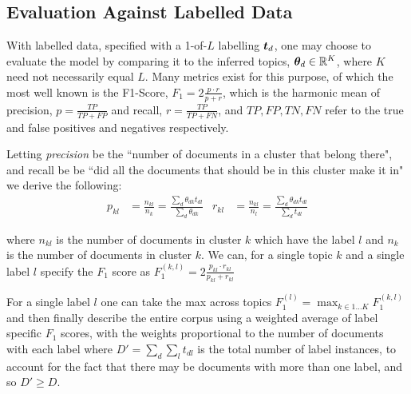 \subsection*{Evaluation Against Labelled Data}
With labelled data, specified with a 1-of-$L$ labelling $\bm t_d$, one may choose to evaluate the model by comparing it to the inferred topics, ${ \bm \theta_d } \in { \mathbb{R}^{K} }$, where $K$ need not necessarily equal $L$. Many metrics exist for this purpose, of which the most well known is the F1-Score, $F_1 = 2 \frac{p \cdot r}{p + r}$, which is the harmonic mean of precision, $p=\frac{TP}{TP+FP}$ and recall, $r=\frac{TP}{TP+FN}$, and $TP, FP, TN, FN$ refer to the true and false positives and negatives respectively.


Letting \emph{precision} be the ``number of documents in a cluster that belong there", and recall be be ``did all the documents that should be in this cluster make it in" we derive the following:
\begin{align}
p_{kl} & = \frac{n_{kl}}{n_k} = \frac{\sum_d \theta_{dk} t_{dl}}{\sum_d \theta_{dk}}  & r_{kl} & = \frac{n_{kl}}{n_l} = \frac{\sum_d \theta_{dk} t_{dl}}{\sum_d t_{dl}} \label{eqn:myrecall}
\end{align}

where $n_{kl}$ is the number of documents in cluster $k$ which have the label $l$ and $n_k$ is the number of documents in cluster $k$. We can, for a single topic $k$ and a single label $l$ specify the $F_1$ score as $F_1^{(k,l)} = 2 \frac{p_{kl} \cdot {r_{kl}}}{p_{kl} + {r_{kl}}}$

For a single label $l$ one can take the max across topics $F_1^{(l)} = \max_{k \in 1\ldots K} F_1^{(k,l)}$ and then finally describe the entire corpus using a weighted average of label specific $F_1$ scores, with the weights proportional to the number of documents with each label where $D' = \sum_d \sum_l t_{dl}$ is the total number of label instances, to account for the fact that there may be documents with more than one label, and so $D' \geq D$.


